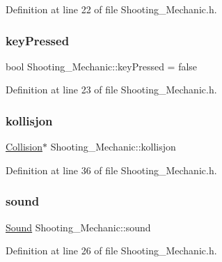 Definition at line 22 of file Shooting\+\_\+\+Mechanic.\+h.

\hypertarget{class_shooting___mechanic_a7c7d3ab2cad3c1cecf5e167021960128}{}\label{class_shooting___mechanic_a7c7d3ab2cad3c1cecf5e167021960128} 
\subsubsection{\texorpdfstring{key\+Pressed}{keyPressed}}
{\footnotesize\ttfamily bool Shooting\+\_\+\+Mechanic\+::key\+Pressed = false\hspace{0.3cm}{\ttfamily [protected]}}



Definition at line 23 of file Shooting\+\_\+\+Mechanic.\+h.

\hypertarget{class_shooting___mechanic_a73bdc235eb4ec579ba4d715cdb295e4e}{}\label{class_shooting___mechanic_a73bdc235eb4ec579ba4d715cdb295e4e} 
\subsubsection{\texorpdfstring{kollisjon}{kollisjon}}
{\footnotesize\ttfamily \hyperlink{class_collision}{Collision}$\ast$ Shooting\+\_\+\+Mechanic\+::kollisjon}



Definition at line 36 of file Shooting\+\_\+\+Mechanic.\+h.

\hypertarget{class_shooting___mechanic_aae7e73612b2103509fb73b11f0a24b70}{}\label{class_shooting___mechanic_aae7e73612b2103509fb73b11f0a24b70} 
\subsubsection{\texorpdfstring{sound}{sound}}
{\footnotesize\ttfamily \hyperlink{class_sound}{Sound} Shooting\+\_\+\+Mechanic\+::sound\hspace{0.3cm}{\ttfamily [protected]}}



Definition at line 26 of file Shooting\+\_\+\+Mechanic.\+h.

